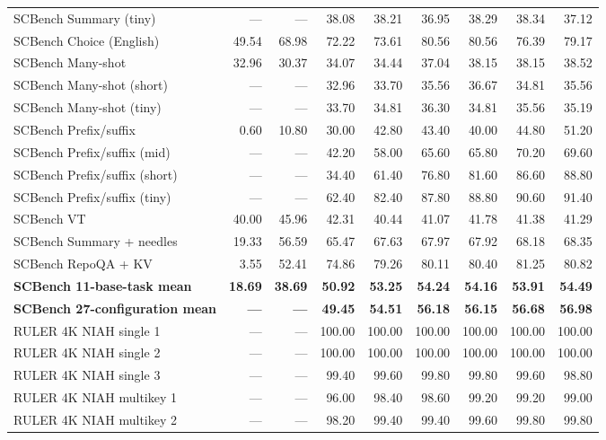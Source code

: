 \begin{longtable}{@{}lrrrrrrrr@{}}
SCBench Summary (tiny) & --- & --- & 38.08 & 38.21 & 36.95 & 38.29 & 38.34 & 37.12 \\
SCBench Choice (English) & 49.54 & 68.98 & 72.22 & 73.61 & 80.56 & 80.56 & 76.39 & 79.17 \\
SCBench Many-shot & 32.96 & 30.37 & 34.07 & 34.44 & 37.04 & 38.15 & 38.15 & 38.52 \\
SCBench Many-shot (short) & --- & --- & 32.96 & 33.70 & 35.56 & 36.67 & 34.81 & 35.56 \\
SCBench Many-shot (tiny) & --- & --- & 33.70 & 34.81 & 36.30 & 34.81 & 35.56 & 35.19 \\
SCBench Prefix/suffix & 0.60 & 10.80 & 30.00 & 42.80 & 43.40 & 40.00 & 44.80 & 51.20 \\
SCBench Prefix/suffix (mid) & --- & --- & 42.20 & 58.00 & 65.60 & 65.80 & 70.20 & 69.60 \\
SCBench Prefix/suffix (short) & --- & --- & 34.40 & 61.40 & 76.80 & 81.60 & 86.60 & 88.80 \\
SCBench Prefix/suffix (tiny) & --- & --- & 62.40 & 82.40 & 87.80 & 88.80 & 90.60 & 91.40 \\
SCBench VT & 40.00 & 45.96 & 42.31 & 40.44 & 41.07 & 41.78 & 41.38 & 41.29 \\
SCBench Summary + needles & 19.33 & 56.59 & 65.47 & 67.63 & 67.97 & 67.92 & 68.18 & 68.35 \\
SCBench RepoQA + KV & 3.55 & 52.41 & 74.86 & 79.26 & 80.11 & 80.40 & 81.25 & 80.82 \\
\hline
\textbf{SCBench 11-base-task mean} & \textbf{18.69} & \textbf{38.69} & \textbf{50.92} & \textbf{53.25} & \textbf{54.24} & \textbf{54.16} & \textbf{53.91} & \textbf{54.49} \\
\hline
\hline
\textbf{SCBench 27-configuration mean} & \textbf{---} & \textbf{---} & \textbf{49.45} & \textbf{54.51} & \textbf{56.18} & \textbf{56.15} & \textbf{56.68} & \textbf{56.98} \\
\hline
\pagebreak[4]
RULER 4K NIAH single 1 & --- & --- & 100.00 & 100.00 & 100.00 & 100.00 & 100.00 & 100.00 \\
RULER 4K NIAH single 2 & --- & --- & 100.00 & 100.00 & 100.00 & 100.00 & 100.00 & 100.00 \\
RULER 4K NIAH single 3 & --- & --- & 99.40 & 99.60 & 99.80 & 99.80 & 99.60 & 98.80 \\
RULER 4K NIAH multikey 1 & --- & --- & 96.00 & 98.40 & 98.60 & 99.20 & 99.20 & 99.00 \\
RULER 4K NIAH multikey 2 & --- & --- & 98.20 & 99.40 & 99.40 & 99.60 & 99.80 & 99.80 \\

\end{longtable}
